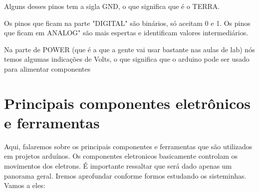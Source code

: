 \documentclass{report}
\begin{document}
	Alguns desses pinos tem a sigla GND, o que significa que é o TERRA.
	
	Os pinos que ficam na parte "DIGITAL" são binários, só aceitam 0 e 1. Os pinos que ficam em ANALOG" são mais espertas e identificam valores intermediários.
	
	Na parte de POWER (que é a que a gente vai usar bastante nas aulas de lab) nós temos algumas indicações de Volts, o que significa que o arduino pode ser usado para alimentar componentes
	
	
	
	\section{Principais componentes eletrônicos e ferramentas}
	
	Aqui, falaremos sobre os principais componentes e ferramentas que são utilizados em projetos arduínos. Os componentes eletronicos basicamente controlam os movimentos dos eletrons. É importante ressaltar que será dado apenas um panorama geral. 
	Iremos aprofundar conforme formos estudando os sisteminhas. Vamos a eles:
	
\end{document}
